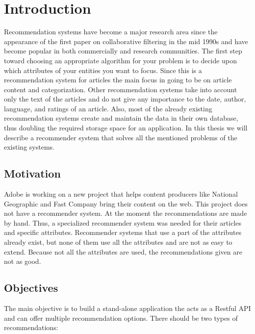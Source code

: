 \chapter{Introduction}
\label{chapter:intro}

Recommendation systems have become a major research area since the appearance of the first paper on collaborative filtering in the mid 1990s and have become popular in both commercially and research communities. The first step toward choosing an appropriate algorithm for your problem is to decide upon which attributes of your entities you want to focus. Since this is a recommendation system for articles the main focus in going to be on article content and categorization. Other recommendation systems take into account only the text of the articles and do not give any importance to the date, author, language, and ratings of an article. Also, most of the already existing recommendation systems create and maintain the data in their own database, thus doubling the required storage space for an application. In this thesis we will describe a recommender system that solves all the mentioned problems of the existing systems.\\

\section{Motivation}
\label{sec:motivation}
Adobe is working on a new project that helps content producers like National Geographic and Fast Company bring their content on the web. This project does not have a recommender system. At the moment the recommendations are made by hand. Thus, a specialized recommender system was needed for their articles and specific attributes. Recommender systems that use a part of the attributes already exist, but none of them use all the attributes and are not as easy to extend. Because not all the attributes are used, the recommendations given are not as good.

\section{Objectives}
\label{sec:objectives}
The main objective is to build a stand-alone application the acts as a Restful API and can offer multiple recommendation options. There should be two types of recommendations:

